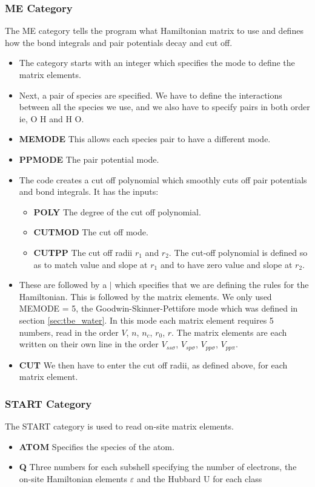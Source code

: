 \documentclass{article}
\begin{document}
\begin{multicols}{2}
\subsubsection{ME Category} The ME category tells the program what Hamiltonian matrix
      to use and defines how the bond integrals and pair potentials decay and cut off.
\begin{itemize}
	\item The category starts with an integer which specifies the mode to define the matrix elements.
	\item Next, a pair of species are specified. We have to define the interactions between all the species we use, and we also have to specify pairs in both order ie, O H and H O.
	\item \textbf{MEMODE} This allows each species pair to have a different mode.
	\item \textbf{PPMODE} The pair potential mode.
	\item The code creates a cut off polynomial which smoothly cuts off pair potentials and bond integrals. It has the inputs:
	\begin{itemize}
	    \item \textbf{POLY} The degree of the cut off polynomial.
	    \item \textbf{CUTMOD} The cut off mode.
		\item \textbf{CUTPP} The cut off radii $r_{1}$ and $r_{2}$. The cut-off polynomial is defined so as to match value and slope at $r_1$ and to have zero value and slope at $r_2$.
	\end{itemize}
	\item These are followed by a $\vert$ which specifies that we are defining the rules for the Hamiltonian. This is followed by the matrix elements. We only used MEMODE = 5, the Goodwin-Skinner-Pettifore mode which was defined in section \ref{sec:tbe_water}. In this mode each matrix element requires 5 numbers, read in the order $V$, $n$, $n_{c}$, $r_{0}$, $r$. The matrix elements are each written on their own line in the order $V_{ss\sigma}$, $V_{sp\sigma}$, $V_{pp\sigma}$, $V_{pp\pi}$.
	\item \textbf{CUT} We then have to enter the cut off radii, as defined above, for each matrix element.	
\end{itemize}
\subsubsection{START Category} The START category is used to read on-site matrix elements.
\begin{itemize}
	\item{\textbf{ATOM} Specifies the species of the atom.}
	\item{\textbf{Q} Three numbers for each subshell specifying the number of electrons, the on-site Hamiltonian elements $\varepsilon$ and the Hubbard U for each class}
\end{itemize}

\end{multicols}
\end{document}
